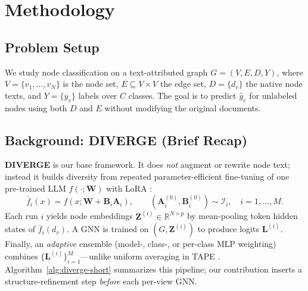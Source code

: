 \documentclass{article}
\begin{document}
\section{Methodology}
\label{sec:methodology}

\subsection{Problem Setup}
We study node classification on a text-attributed graph
$G=(V,E,D,Y)$, where $V=\{v_1,\ldots,v_N\}$ is the node set,
$E\subseteq V\times V$ the edge set, $D=\{d_v\}$ the native node texts,
and $Y=\{y_v\}$ labels over $C$ classes. The goal is to predict
$\hat{y}_v$ for unlabeled nodes using both $D$ and $E$ without modifying
the original documents.


\subsection{Background: DIVERGE (Brief Recap)}
\label{sec:diverge-recap}

\textbf{DIVERGE} \citep{he2024harnessing} is our base framework. It does \emph{not}
augment or rewrite node text; instead it builds diversity from repeated
parameter-efficient fine-tuning of one pre-trained LLM $f(\cdot;\mathbf{W})$ with
LoRA \citep{Hu2021LoRA}:
\begin{equation}
\bar{f}_i(x)=f(x;\mathbf{W}+\mathbf{B}_i\mathbf{A}_i),
\qquad
(\mathbf{A}^{(0)}_i,\mathbf{B}^{(0)}_i)\sim\mathcal{I}_i,
\quad i=1,\ldots,M.
\label{eq:fbar}
\end{equation}
Each run $i$ yields node embeddings $\mathbf{Z}^{(i)}\in\mathbb{R}^{N\times p}$ by
mean-pooling token hidden states of $\bar{f}_i(d_v)$. A GNN is trained on
$(G,\mathbf{Z}^{(i)})$ to produce logits $\mathbf{L}^{(i)}$. Finally, an
\emph{adaptive} ensemble (model-, class-, or per-class MLP weighting) combines
$\{\mathbf{L}^{(i)}\}_{i=1}^{M}$---unlike uniform averaging in TAPE
\citep{he2024harnessing}. Algorithm~\ref{alg:diverge-short} summarizes this pipeline;
our contribution inserts a structure-refinement step \emph{before} each per-view GNN.
\end{document}
